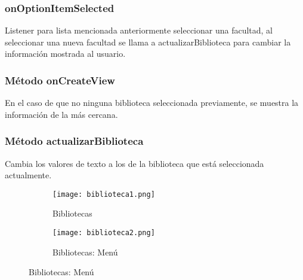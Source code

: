 \subsubsection{onOptionItemSelected}
Listener para lista mencionada anteriormente seleccionar una facultad, al seleccionar una nueva facultad se llama a actualizarBiblioteca para cambiar la información mostrada al usuario.

\subsubsection{Método onCreateView}
En el caso de que no ninguna biblioteca seleccionada previamente, se muestra la información de la más cercana.

\subsubsection{Método actualizarBiblioteca}
Cambia los valores de texto a los de la biblioteca que está seleccionada actualmente.




\begin{figure}[H]
  \begin{subfigure}{0.5\textwidth}
    \centering
    \texttt{[image: biblioteca1.png]}
    \caption{Bibliotecas}
    \label{fig:sub-first}
  \end{subfigure}
  \begin{subfigure}{0.5\textwidth}
    \centering
	  \texttt{[image: biblioteca2.png]}
    \caption{Bibliotecas: Menú }
    \label{fig:sub-second}
  \end{subfigure}
\end{figure}





